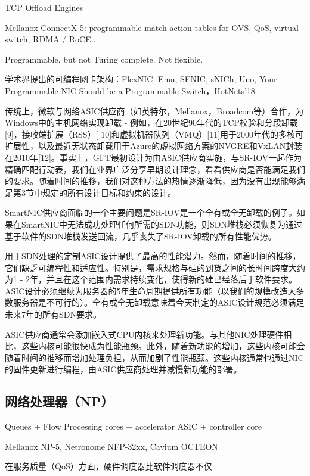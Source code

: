 TCP Offload Engines

Mellanox ConnectX-5: programmable match-action tables for OVS, QoS, virtual switch, RDMA / RoCE...

Programmable, but not Turing complete. Not flexible.

学术界提出的可编程网卡架构：FlexNIC, Emu, SENIC, sNICh, Uno, Your Programmable NIC Should be a Programmable Switch，HotNets'18


传统上，微软与网络ASIC供应商（如英特尔，Mellanox，Broadcom等）合作，为Windows中的主机网络实现卸载 - 例如，在20世纪90年代的TCP校验和分段卸载[9]，接收端扩展（RSS）[ 10]和虚拟机器队列（VMQ）[11]用于2000年代的多核可扩展性，以及最近无状态卸载用于Azure的虚拟网络方案的NVGRE和VxLAN封装在2010年[12]。事实上，GFT最初设计为由ASIC供应商实施，与SR-IOV一起作为精确匹配行动表，我们在业界广泛分享早期设计理念，看看供应商是否能满足我们的要求。随着时间的推移，我们对这种方法的热情逐渐降低，因为没有出现能够满足第3节中规定的所有设计目标和约束的设计。

SmartNIC供应商面临的一个主要问题是SR-IOV是一个全有或全无卸载的例子。如果在SmartNIC中无法成功处理任何所需的SDN功能，则SDN堆栈必须恢复为通过基于软件的SDN堆栈发送回流，几乎丧失了SR-IOV卸载的所有性能优势。



用于SDN处理的定制ASIC设计提供了最高的性能潜力。然而，随着时间的推移，它们缺乏可编程性和适应性。特别是，需求规格与硅的到货之间的长时间跨度大约为1  -  2年，并且在这个范围内需求持续变化，使得新的硅已经落后于软件要求。 ASIC设计必须继续为服务器的5年生命周期提供所有功能（以我们的规模改造大多数服务器是不可行的）。全有或全无卸载意味着今天制定的ASIC设计规范必须满足未来7年的所有SDN要求。

ASIC供应商通常会添加嵌入式CPU内核来处理新功能。与其他NIC处理硬件相比，这些内核可能很快成为性能瓶颈。此外，随着新功能的增加，这些内核可能会随着时间的推移而增加处理负担，从而加剧了性能瓶颈。这些内核通常也通过NIC的固件更新进行编程，由ASIC供应商处理并减慢新功能的部署。


\subsection{网络处理器（NP）}
\label{smartnic-np}

Queues + Flow Processing cores + accelerator ASIC + controller core

Mellanox NP-5, Netronome NFP-32xx, Cavium OCTEON

在服务质量（QoS）方面，硬件调度器比软件调度器不仅 \cite{kaffes2019shinjuku,ousterhout2019shenango}


